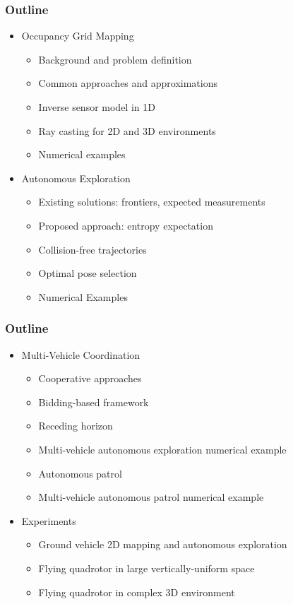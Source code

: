 \documentclass[11pt,professionalfonts,hyperref={pdftex,pdfpagemode=none,pdfstartview=FitH}]{beamer}
\begin{document}
\begin{frame}
\frametitle{Outline}
\begin{itemize}
	\item Occupancy Grid Mapping
	\begin{itemize}
		\item Background and problem definition
		\item Common approaches and approximations
		\item Inverse sensor model in 1D
		\item Ray casting for 2D and 3D environments
		\item Numerical examples
	\end{itemize}
	\pause
	\item Autonomous Exploration
	\begin{itemize}
		\item Existing solutions: frontiers, expected measurements
		\item Proposed approach: entropy expectation
		\item Collision-free trajectories
		\item Optimal pose selection
		\item Numerical Examples
	\end{itemize}
\end{itemize}
\end{frame}

\begin{frame}
\frametitle{Outline}
\begin{itemize}
	\item Multi-Vehicle Coordination
	\begin{itemize}
		\item Cooperative approaches
		\item Bidding-based framework
		\item Receding horizon
		\item Multi-vehicle autonomous exploration numerical example
		\item Autonomous patrol
		\item Multi-vehicle autonomous patrol numerical example
	\end{itemize}
	\pause
	\item Experiments
	\begin{itemize}
		\item Ground vehicle 2D mapping and autonomous exploration
		\item Flying quadrotor in large vertically-uniform space
		\item Flying quadrotor in complex 3D environment
	\end{itemize}
\end{itemize}
\end{frame}
\end{document}
